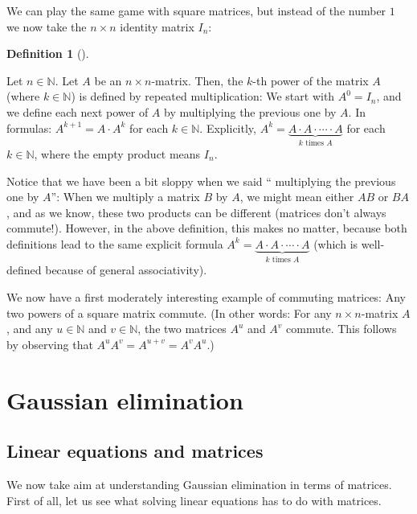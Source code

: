 \documentclass[numbers=enddot,12pt,final,onecolumn,notitlepage]{scrartcl}%
\theoremstyle{definition}
\newtheorem{defi}[theo]{Definition}
\newenvironment{definition}[1][]
{\begin{defi}[#1]\begin{leftbar}}
{\end{leftbar}\end{defi}}
\begin{document}
We can play the same game with square matrices, but instead of the number $1$
we now take the $n\times n$ identity matrix $I_{n}$:

\begin{definition}
Let $n\in\mathbb{N}$. Let $A$ be an $n\times n$-matrix. Then, the $k$-th power
of the matrix $A$ (where $k\in\mathbb{N}$) is defined by repeated
multiplication: We start with $A^{0}=I_{n}$, and we define each next power of
$A$ by multiplying the previous one by $A$. In formulas: $A^{k+1}=A\cdot
A^{k}$ for each $k\in\mathbb{N}$. Explicitly, $A^{k}=\underbrace{A\cdot
A\cdot\cdots\cdot A}_{k\text{ times }A}$ for each $k\in\mathbb{N}$, where the
empty product means $I_{n}$.
\end{definition}

Notice that we have been a bit sloppy when we said \textquotedblleft
multiplying the previous one by $A$\textquotedblright: When we multiply a
matrix $B$ by $A$, we might mean either $AB$ or $BA$, and as we know, these
two products can be different (matrices don't always commute!). However, in
the above definition, this makes no matter, because both definitions lead to
the same explicit formula $A^{k}=\underbrace{A\cdot A\cdot\cdots\cdot
A}_{k\text{ times }A}$ (which is well-defined because of general associativity).

We now have a first moderately interesting example of commuting matrices: Any
two powers of a square matrix commute. (In other words: For any $n\times
n$-matrix $A$, and any $u\in\mathbb{N}$ and $v\in\mathbb{N}$, the two matrices
$A^{u}$ and $A^{v}$ commute. This follows by observing that $A^{u}%
A^{v}=A^{u+v}=A^{v}A^{u}$.)

\section{Gaussian elimination}

\subsection{Linear equations and matrices}

We now take aim at understanding Gaussian elimination in terms of matrices.
First of all, let us see what solving linear equations has to do with matrices.
\end{document}
